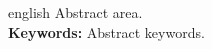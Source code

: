 \begin{resumo}[Abstract]
 \begin{otherlanguage*}{english}
Abstract area.\\
\textbf{Keywords:} Abstract keywords.
 \end{otherlanguage*}
\end{resumo}